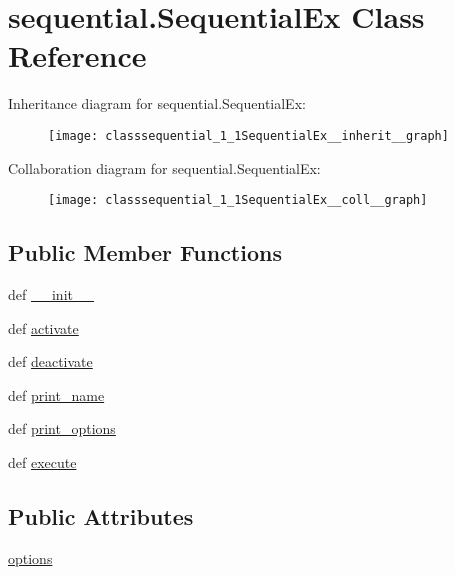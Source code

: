 \hypertarget{classsequential_1_1SequentialEx}{\section{sequential.\-Sequential\-Ex Class Reference}
\label{classsequential_1_1SequentialEx}
}


Inheritance diagram for sequential.\-Sequential\-Ex\-:\nopagebreak
\begin{figure}[H]
\begin{center}
\leavevmode
\texttt{[image: classsequential\_1\_1SequentialEx\_\_inherit\_\_graph]}
\end{center}
\end{figure}


Collaboration diagram for sequential.\-Sequential\-Ex\-:\nopagebreak
\begin{figure}[H]
\begin{center}
\leavevmode
\texttt{[image: classsequential\_1\_1SequentialEx\_\_coll\_\_graph]}
\end{center}
\end{figure}
\subsection*{Public Member Functions}
\begin{DoxyCompactItemize}
\item 
def \hyperlink{classsequential_1_1SequentialEx_aef3e664b94447607395ba443ef126600}{\-\_\-\-\_\-init\-\_\-\-\_\-}
\item 
def \hyperlink{classsequential_1_1SequentialEx_a0395a18b172a964a208b5d39e5e6e9cd}{activate}
\item 
def \hyperlink{classsequential_1_1SequentialEx_ad0324c90b6af183853dc5453341bc166}{deactivate}
\item 
def \hyperlink{classsequential_1_1SequentialEx_ab82c1f57be3191cc5440df41a989cb90}{print\-\_\-name}
\item 
def \hyperlink{classsequential_1_1SequentialEx_a1d154cd0643f05739b7f62d14fa3be2f}{print\-\_\-options}
\item 
def \hyperlink{classsequential_1_1SequentialEx_ad0371440bf0b65e8e59249d73d248cc7}{execute}
\end{DoxyCompactItemize}
\subsection*{Public Attributes}
\begin{DoxyCompactItemize}
\item 
\hyperlink{classsequential_1_1SequentialEx_a72ae94e2c46c2b1b8c5022eaf3593edf}{options}
\end{DoxyCompactItemize}


